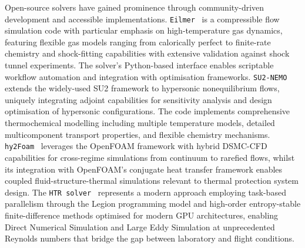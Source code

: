 Open-source solvers have gained prominence through community-driven development and accessible implementations. \texttt{Eilmer}~\citep{Gollan2013} is a compressible flow simulation code with particular emphasis on high-temperature gas dynamics, featuring flexible gas models ranging from calorically perfect to finite-rate chemistry and shock-fitting capabilities with extensive validation against shock tunnel experiments. The solver's Python-based interface enables scriptable workflow automation and integration with optimisation frameworks. \texttt{SU2-NEMO}~\citep{MaierEtAl2021} extends the widely-used SU2 framework to hypersonic nonequilibrium flows, uniquely integrating adjoint capabilities for sensitivity analysis and design optimisation of hypersonic configurations. The code implements comprehensive thermochemical modelling including multiple temperature models, detailed multicomponent transport properties, and flexible chemistry mechanisms. \texttt{hy2Foam}~\citep{Casseau2016a,Casseau2016b} leverages the OpenFOAM framework with hybrid DSMC-CFD capabilities for cross-regime simulations from continuum to rarefied flows, whilst its integration with OpenFOAM's conjugate heat transfer framework enables coupled fluid-structure-thermal simulations relevant to thermal protection system design. The \texttt{HTR solver}~\citep{DiRenzoFuUrzay2020} represents a modern approach employing task-based parallelism through the Legion programming model and high-order entropy-stable finite-difference methods optimised for modern GPU architectures, enabling Direct Numerical Simulation and Large Eddy Simulation at unprecedented Reynolds numbers that bridge the gap between laboratory and flight conditions.

